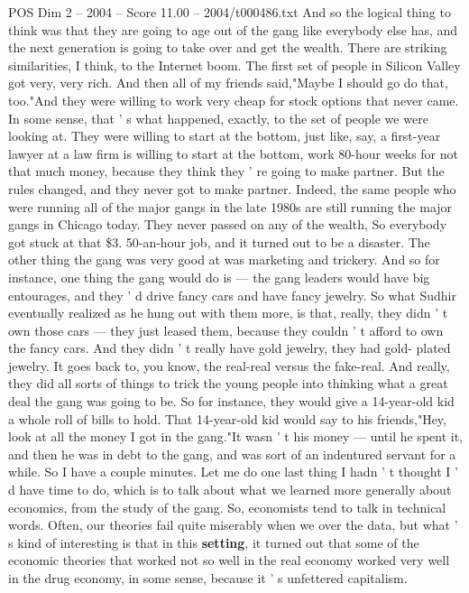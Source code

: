 \begin{textsample}{POS Dim 2 – 2004 – Score 11.00 – 2004/t000486.txt}
And so the logical thing to think was that they are going to age out of the gang like everybody else has, and the next generation is going to take over and get the wealth.
There are striking similarities, I think, to the Internet boom.
The first set of people in Silicon Valley got very, very rich.
And then all of my friends said,"Maybe I should go do that, too."And they were willing to work very cheap for stock options that never came.
In some sense, that ' s what happened, exactly, to the set of people we were looking at.
They were willing to start at the bottom, just like, say, a first-year lawyer at a law firm is willing to start at the bottom, work 80-hour weeks for not that much money, because they think they ' re going to make partner.
But the rules changed, and they never got to make partner.
Indeed, the same people who were running all of the major gangs in the late 1980s are still running the major gangs in Chicago today.
They never passed on any of the wealth, So everybody got stuck at that \$3. 50-an-hour job, and it turned out to be a disaster.
The other thing the gang was very good at was marketing and trickery.
And so for instance, one thing the gang would do is — the gang leaders would have big entourages, and they ' d drive fancy cars and have fancy jewelry.
So what Sudhir eventually realized as he hung out with them more, is that, really, they didn ' t own those cars — they just leased them, because they couldn ' t afford to own the fancy cars.
And they didn ' t really have gold jewelry, they had gold- plated jewelry.
It goes back to, you know, the real-real versus the fake-real.
And really, they did all sorts of things to trick the young people into thinking what a great deal the gang was going to be.
So for instance, they would give a 14-year-old kid a whole roll of bills to hold.
That 14-year-old kid would say to his friends,"Hey, look at all the money I got in the gang."It wasn ' t his money — until he spent it, and then he was in debt to the gang, and was sort of an indentured servant for a while.
So I have a couple minutes.
Let me do one last thing I hadn ' t thought I ' d have time to do, which is to talk about what we learned more generally about economics, from the study of the gang.
So, economists tend to talk in technical words.
Often, our theories fail quite miserably when we over the data, but what ' s kind of interesting is that in this \textbf{setting}, it turned out that some of the economic theories that worked not so well in the real economy worked very well in the drug economy, in some sense, because it ' s unfettered capitalism.

\end{textsample}
